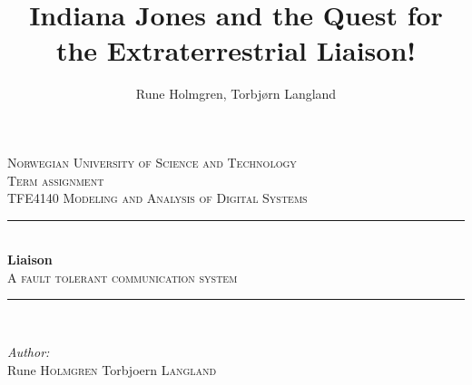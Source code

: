 \documentclass[a4paper]{IEEEtran}
\title{Indiana Jones and the Quest for the Extraterrestrial Liaison!}
\author{
    Rune Holmgren,
    Torbjørn Langland
}
\begin{document}
\begin{titlepage}

    \newcommand{\HRule}{\rule{\linewidth}{0.5mm}} %

    \center %

    \vspace*{3cm}


    \textsc{\LARGE Norwegian University of Science and Technology}\\[1.5cm] %
    \vspace*{1cm}
    \textsc{\Large Term assignment}\\[0.5cm] %
    \textsc{\large TFE4140 Modeling and Analysis of Digital Systems}\\[0.5cm] %
    \vspace*{1.4cm}


    \HRule \\[0.4cm]
    { \huge \bfseries Liaison}\\[0.4cm] %
    \textsc{\large A fault tolerant communication system}\\[0.5cm] %
    \HRule \\[1.5cm]

    \vspace*{1cm}

    \begin{minipage}{0.4\textwidth}
        \begin{flushleft} \large
            \emph{Author:}\\
            Rune \textsc{Holmgren} \newline%
            Torbjoern \textsc{Langland} %
        \end{flushleft}
    \end{minipage}
    ~
    \begin{minipage}{0.4\textwidth}
        \begin{flushright} \large
            \emph{} \\
            \textsc{} %
        \end{flushright}
    \end{minipage}\\[4cm]


\end{titlepage}
\end{document}
